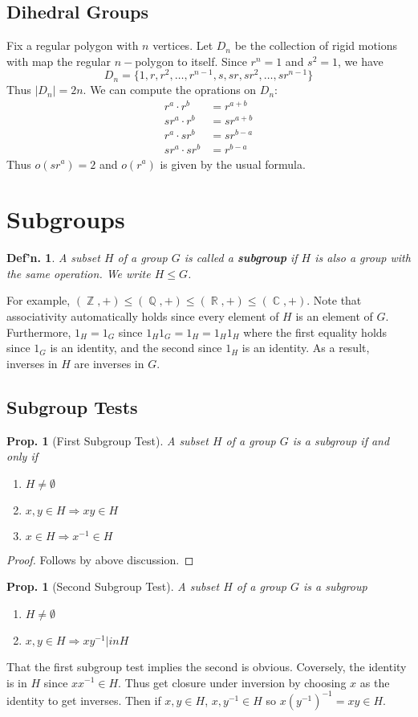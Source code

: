 \documentclass[12pt, a4paper]{book}
\DeclareMathOperator{\Q}{\mathbb{Q}}
\DeclareMathOperator{\Z}{\mathbb{Z}}
\DeclareMathOperator{\R}{\mathbb{R}}
\DeclareMathOperator{\C}{\mathbb{C}}
\newtheorem{definition}[theorem]{Def'n.}
\newtheorem{proposition}[theorem]{Prop.}
\theoremstyle{nonumberplain}
\newtheorem{proof}{Proof}
\begin{document}
\subsection{Dihedral Groups}
Fix a regular polygon with $n$ vertices.
Let $D_n$ be the collection of rigid motions with map the regular $n-$polygon to itself.
Since $r^n=1$ and $s^2=1$, we have
\[D_n=\{1,r,r^2,\ldots,r^{n-1},s,sr,sr^2,\ldots,sr^{n-1}\}\]
Thus $|D_n|=2n$.
We can compute the oprations on $D_n$:
\begin{align*}
    r^a\cdot r^b &= r^{a+b}\\
    sr^a\cdot r^b &= sr^{a+b}\\
    r^a\cdot sr^b &= sr^{b-a}\\
    sr^a\cdot sr^b &= r^{b-a}
\end{align*}
Thus $o(sr^a)=2$ and $o(r^a)$ is given by the usual formula.
\section{Subgroups}
\begin{definition}
    A subset $H$ of a group $G$ is called a \textbf{subgroup} if $H$ is also a group with the same operation.
    We write $H\leq G$.
\end{definition}
For example, $(\Z,+)\leq(\Q,+)\leq(\R,+)\leq(\C,+)$.
Note that associativity automatically holds since every element of $H$ is an element of $G$.
Furthermore, $1_H=1_G$ since $1_H1_G=1_H=1_H1_H$ where the first equality holds since $1_G$ is an identity, and the second since $1_H$ is an identity.
As a result, inverses in $H$ are inverses in $G$.
\subsection{Subgroup Tests}
\begin{proposition}[First Subgroup Test]
    A subset $H$ of a group $G$ is a subgroup if and only if
    \begin{enumerate}
        \item $H\neq\emptyset$
        \item $x,y\in H\Rightarrow xy\in H$
        \item $x\in H\Rightarrow x^{-1}\in H$
    \end{enumerate}
\end{proposition}
\begin{proof}
    Follows by above discussion.
\end{proof}
\begin{proposition}[Second Subgroup Test]
    A subset $H$ of a group $G$ is a subgroup
    \begin{enumerate}
        \item $H\neq\emptyset$
        \item $x,y\in H\Rightarrow xy^{-1}|in H$
    \end{enumerate}
\end{proposition}
That the first subgroup test implies the second is obvious.
Coversely, the identity is in $H$ since $xx^{-1}\in H$.
Thus get closure under inversion by choosing $x$ as the identity to get inverses.
Then if $x,y\in H$, $x,y^{-1}\in H$ so $x(y^{-1})^{-1}=xy\in H$.
\end{document}
